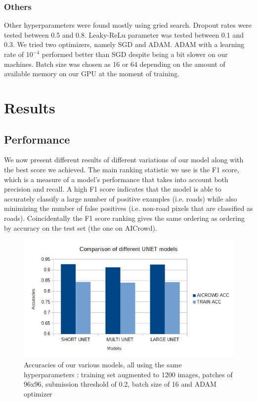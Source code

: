 \documentclass[10pt,conference,compsocconf]{IEEEtran}
\begin{document}
\subsubsection{Others}
Other hyperparameters were found mostly using gried search. Dropout rates were tested between 0.5 and 0.8. Leaky-ReLu parameter was tested between 0.1 and 0.3. We tried two optimizers, namely SGD and ADAM. ADAM with a learning rate of $10^{-4}$ performed better than SGD despite being a bit slower on our machines. Batch size was chosen as 16 or 64 depending on the amount of available memory on our GPU at the moment of training.
\section{Results}
\subsection{Performance}
We now present different results of different variations of our model along with the best score we achieved. The main ranking statistic we use is the F1 score, which is a measure of a model's performance that takes into account both precision and recall. A high F1 score indicates that the model is able to accurately classify a large number of positive examples (i.e. roads) while also minimizing the number of false positives (i.e. non-road pixels that are classified as roads). Coincidentally the F1 score ranking gives the same ordering as ordering by accuracy on the test set (the one on AICrowd).
\begin{figure}[H]
    \centering
    \includegraphics[scale = 0.4]{report_images/models_graph.png} %
    \caption{Accuracies of our various models, all using the same hyperparameters : training set augmented to 1200 images, patches of 96x96, submission threshold of 0.2, batch size of 16 and ADAM optimizer}
\end{figure}
\end{document}
